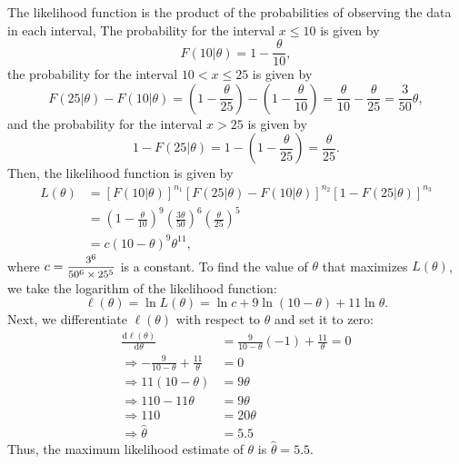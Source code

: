 \begin{solution}
    The likelihood function is the product of the probabilities of observing the data in each interval, 
    The probability for the interval $x \leq 10$ is given by 
    \[ 
        F(10|\theta) = 1 - \frac{\theta}{10},
    \]
    the probability for the interval $10 < x \leq 25$ is given by 
    \[
        F(25|\theta) - F(10|\theta) = \left(1 - \frac{\theta}{25}\right) - \left(1 - \frac{\theta}{10}\right) = \frac{\theta}{10} - \frac{\theta}{25} = \frac{3}{50}\theta,    
    \] 
    and the probability for the interval $x > 25$ is given by 
    \[
        1 - F(25|\theta) = 1 - \left(1 - \frac{\theta}{25}\right) = \frac{\theta}{25}.
    \]
    Then, the likelihood function is given by 
    \begin{align*}
        L(\theta) &= [F(10|\theta)]^{n_1} [F(25|\theta) - F(10|\theta)]^{n_2} [1 - F(25|\theta)]^{n_3}\\
        &= \left(1 - \frac{\theta}{10}\right)^{9} \left(\frac{3\theta}{50}\right)^{6} \left(\frac{\theta}{25}\right)^{5}\\
        &= c(10 - \theta)^9 \theta^{11},
    \end{align*}
    where $c = \mfrac{3^6}{50^6 \times 25^5}$ is a constant. To find the value of $\theta$ that maximizes $L(\theta)$, we take the logarithm of the likelihood function:
    \[
        \ell(\theta) = \ln L(\theta) = \ln c + 9 \ln(10 - \theta) + 11 \ln \theta.
    \]
    Next, we differentiate $\ell(\theta)$ with respect to $\theta$ and set it to zero:
    \begin{align*}
        \frac{\mathrm{d}\ell(\theta)}{\mathrm{d}\theta} &= \frac{9}{10 - \theta}(-1) + \frac{11}{\theta} = 0\\
        \Rightarrow -\frac{9}{10 - \theta} + \frac{11}{\theta} &= 0\\
        \Rightarrow 11(10 - \theta) &= 9\theta\\
        \Rightarrow 110 - 11\theta &= 9\theta\\
        \Rightarrow 110 &= 20\theta\\
        \Rightarrow \hat{\theta} &= 5.5
    \end{align*}
    Thus, the maximum likelihood estimate of $\theta$ is $\hat{\theta} = 5.5$.
\end{solution}

